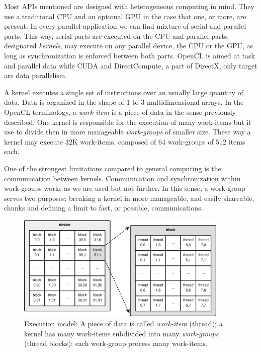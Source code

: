\documentclass{article}
\begin{document}
Most APIs mentioned are designed with heterogeneous computing in
mind. They use a traditional CPU and an optional GPU in the case that
one, or more, are present. In every parallel application we can find
mixture of serial and parallel parts. This way, serial parts are
executed on the CPU and parallel parts, designated \textit{kernels},
may execute on any parallel device, the CPU or the GPU, as long as
synchronization is enforced between both parts. OpenCL is aimed at
task and parallel data while CUDA and DirectCompute, a part of
DirectX, only target are data parallelism.

A kernel executes a single set of instructions over an usually large
quantity of data. Data is organized in the shape of 1 to 3
multidimensional arrays. In the OpenCL terminology, a
\textit{work-item} is a
piece of data in the sense previously described. One kernel is
responsible for the execution of many work-items but it use to divide
then in more manageable \textit{work-groups} of smaller size. These
way a kernel may execute 32K work-items, composed of 64 work-groups of
512 items each.

One of the strongest limitations compared to general computing is the
communication between kernels. Communication and synchronization
within work-groups works as we are used but not further. In this
sense, a work-group serves two purposes: breaking a kernel in more
manageable, and easily shareable, chunks and defining a limit to fast, or
possible, communications.

\begin{figure}[!ht]
\centering
\includegraphics[width=0.9\textwidth]{grid.eps}
\caption{Execution model: A piece of data is called {\it work-item} (thread); a kernel has many work-items subdivided into many {\it work-groups} (thread blocks); each work-group process many work-items.}
\label{figure:grid}
\end{figure}


\end{document}
